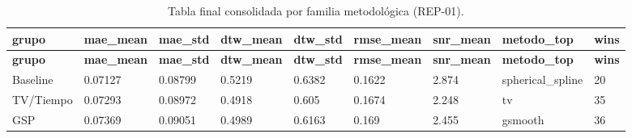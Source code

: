 \begin{landscape}
\scriptsize
\begin{longtable}{p{}p{}p{}p{}p{}p{}p{}p{}p{}}
\caption{Tabla final consolidada por familia metodológica (REP-01).}\label{tab:app_rep01_overall}\\
\toprule
\textbf{grupo} & \textbf{mae\_mean} & \textbf{mae\_std} & \textbf{dtw\_mean} & \textbf{dtw\_std} & \textbf{rmse\_mean} & \textbf{snr\_mean} & \textbf{metodo\_top} & \textbf{wins} \\
\midrule
\endfirsthead
\toprule
\textbf{grupo} & \textbf{mae\_mean} & \textbf{mae\_std} & \textbf{dtw\_mean} & \textbf{dtw\_std} & \textbf{rmse\_mean} & \textbf{snr\_mean} & \textbf{metodo\_top} & \textbf{wins} \\
\midrule
\endhead
Baseline & 0.07127 & 0.08799 & 0.5219 & 0.6382 & 0.1622 & 2.874 & spherical\_spline & 20 \\
TV/Tiempo & 0.07293 & 0.08972 & 0.4918 & 0.605 & 0.1674 & 2.248 & tv & 35 \\
GSP & 0.07369 & 0.09051 & 0.4989 & 0.6163 & 0.169 & 2.455 & gsmooth & 36 \\
\bottomrule
\end{longtable}
\normalsize
\end{landscape}

